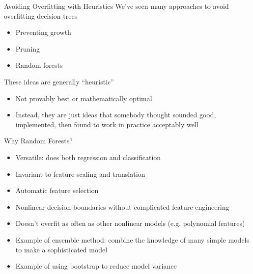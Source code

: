 \documentclass[aspectratio=169]{../latex_main/tntbeamer}  %
\begin{document}
	\begin{frame}{Avoiding Overfitting with Heuristics}
	    We’ve seen many approaches to avoid overfitting decision trees
	    \begin{itemize}
	        \item Preventing growth
	        \item Pruning
	        \item Random forests
	    \end{itemize}
	    \bigskip
	    These ideas are generally “heuristic”

	    \begin{itemize}
	        \item Not provably best or mathematically optimal
	        \item Instead, they are just ideas that somebody thought sounded good, implemented, then found to work in practice acceptably well
	    \end{itemize}
	\end{frame}
	
	
	\begin{frame}{Why Random Forests?}
	    \begin{itemize}
	        \item Versatile: does both regression and classification
	        \item Invariant to feature scaling and translation
	        \item Automatic feature selection
	        \item Nonlinear decision boundaries without complicated feature engineering
	        \item Doesn’t overfit as often as other nonlinear models (e.g. polynomial features)
	        \item Example of ensemble method: combine the knowledge of many simple models to make a sophisticated model
	        \item Example of using bootstrap to reduce model variance
	    \end{itemize}
	\end{frame}
	
	
	
\end{document}
